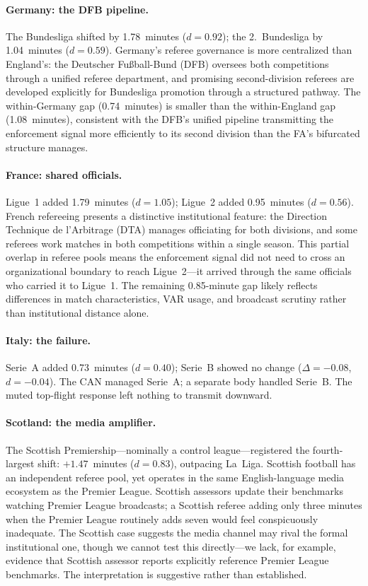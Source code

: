\paragraph{Germany: the DFB pipeline.}
The Bundesliga shifted by 1.78~minutes ($d = 0.92$); the
2.~Bundesliga by 1.04~minutes ($d = 0.59$). Germany's referee
governance is more centralized than England's: the Deutscher
Fu{\ss}ball-Bund (DFB) oversees both competitions through a unified
referee department, and promising second-division referees are developed
explicitly for Bundesliga promotion through a structured pathway. The
within-Germany gap (0.74~minutes) is smaller than the within-England
gap (1.08~minutes), consistent with the DFB's unified pipeline
transmitting the enforcement signal more efficiently to its second
division than the FA's bifurcated structure manages.

\paragraph{France: shared officials.}
Ligue~1 added 1.79~minutes ($d = 1.05$); Ligue~2 added 0.95~minutes
($d = 0.56$). French refereeing presents a distinctive institutional
feature: the Direction Technique de l'Arbitrage (DTA) manages
officiating for both divisions, and some referees work matches in both
competitions within a single season. This partial overlap in referee
pools means the enforcement signal did not need to cross an
organizational boundary to reach Ligue~2---it arrived through the same
officials who carried it to Ligue~1. The remaining 0.85-minute gap
likely reflects differences in match characteristics, VAR usage, and
broadcast scrutiny rather than institutional distance alone.

\paragraph{Italy: the failure.}
Serie~A added 0.73~minutes ($d = 0.40$); Serie~B showed no change
($\Delta = -0.08$, $d = -0.04$). The CAN managed Serie~A; a
separate body handled Serie~B. The muted top-flight response left
nothing to transmit downward.

\paragraph{Scotland: the media amplifier.}
The Scottish Premiership---nominally a control league---registered
the fourth-largest shift: $+1.47$~minutes ($d = 0.83$), outpacing
La~Liga. Scottish football has an independent referee pool, yet
operates in the same English-language media ecosystem as the Premier
League. Scottish assessors update their benchmarks watching Premier
League broadcasts; a Scottish referee adding only three minutes when
the Premier League routinely adds seven would feel conspicuously
inadequate. The Scottish case suggests the media channel may rival the
formal institutional one, though we cannot test this directly---we
lack, for example, evidence that Scottish assessor reports explicitly
reference Premier League benchmarks. The interpretation is suggestive
rather than established.

